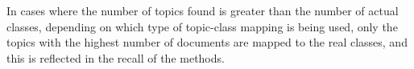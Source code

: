 In cases where the number of topics found is greater than the number of actual classes, depending on which type of topic-class mapping is being used, only the topics with the highest number of documents are mapped to the real classes, and this is reflected in the recall of the methods. 
\begin{figure}[!t]
\end{figure}
